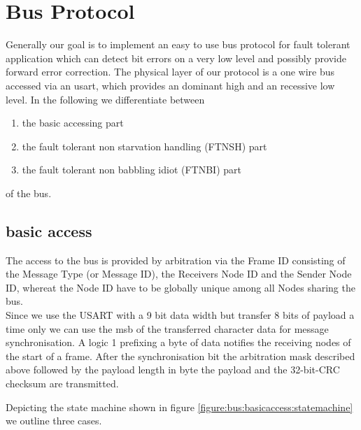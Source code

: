 \documentclass[11pt,a4paper,oneside]{report}
\begin{document}
\section{Bus Protocol}

Generally our goal is to implement an easy to use bus protocol for fault tolerant application which can detect bit errors on a very low level and possibly provide forward error correction.
The physical layer of our protocol is a one wire bus accessed via an usart, which provides an dominant high and an recessive low level.
In the following we differentiate between

\begin{enumerate}
 \item the basic accessing part 
 \item the fault tolerant non starvation handling (FTNSH) part
 \item the fault tolerant non babbling idiot (FTNBI) part
\end{enumerate}

of the bus.\\

\subsection{basic access}

The access to the bus is provided by arbitration via the Frame ID consisting of the Message Type (or Message ID), the Receivers Node ID  and the Sender Node ID, whereat the Node ID have to be globally unique among all Nodes sharing the bus.\\
Since we use the USART with a 9 bit data width but transfer 8 bits of payload a time only we can use the msb of the transferred character data for message synchronisation. A logic 1 prefixing a byte of data notifies the receiving nodes of the start of a frame.
After the synchronisation bit the arbitration mask described above followed by the payload length in byte the payload and the 32-bit-CRC checksum are transmitted.

Depicting the state machine shown in figure \ref{figure:bus:basicaccess:statemachine} we outline three cases.
\end{document}
